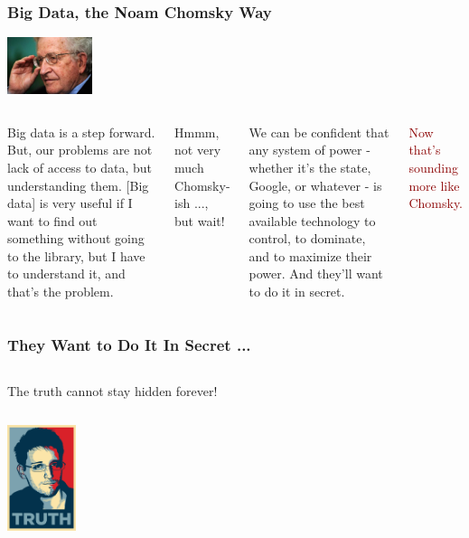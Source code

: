 \documentclass{beamer}
\begin{document}
\begin{frame}
\frametitle{Big Data, the Noam Chomsky Way}
\hspace*{9cm}\includegraphics[width=2.5cm]{figs/chamsky.pdf}
\begin{columns}[c] 
\column{26em}
\begin{block}{}
\justifying
{\scriptsize Big data is a step forward. But, our problems are not lack of access to data, but understanding them. [Big data] is very useful if I want to find out something without going to the library, but I have to understand it, and that's the problem.}
\end{block}
\pause
\centering
\textcolor{Ocean}{Hmmm, not very much Chomsky-ish ..., but wait!}
\pause
\begin{block}{}
\centering
\justifying
{\scriptsize We can be confident that any system of power - whether it's the state, Google, or whatever - is going to use the best available technology to control, to dominate, and to maximize their power. And they'll want to do it in secret.}
\end{block}
\centering
\textcolor{darkred}{Now that's sounding more like Chomsky.}
\end{columns}
\end{frame}

\begin{frame}
\frametitle{They Want to Do It In Secret ...}
\begin{columns}
\column{17em}
\vspace{2cm}
\begin{block}{}
\centering
The truth cannot stay hidden forever!
\end{block}
\end{columns}
\vspace{.75cm}
\hspace*{9cm}\includegraphics[width=2cm]{figs/snowden.pdf}
\end{frame}
\end{document}
